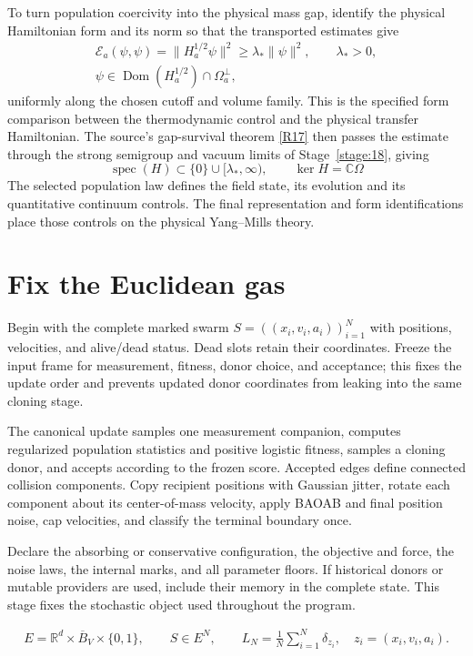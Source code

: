 \documentclass[11pt,a4paper]{article}
\newcommand{\Spec}{\operatorname{spec}}
\begin{document}
To turn population coercivity into the physical mass gap, identify the physical Hamiltonian form and its norm so that the transported estimates give
\begin{gather*}
\mathcal E_a(\psi,\psi)=\|H_a^{1/2}\psi\|^2
\ge\lambda_*\|\psi\|^2,
\qquad\lambda_*>0,\\
\psi\in\operatorname{Dom}(H_a^{1/2})\cap\Omega_a^\perp,
\end{gather*}
uniformly along the chosen cutoff and volume family. This is the specified form comparison between the thermodynamic control and the physical transfer Hamiltonian. The source's gap-survival theorem \hyperref[src:thm-mass-gap-rg-fixed-point]{[R17]} then passes the estimate through the strong semigroup and vacuum limits of Stage~\ref{stage:18}, giving
\[
\Spec(H)\subset\{0\}\cup[\lambda_*,\infty),
\qquad \ker H=\mathbb C\Omega
\]
The selected population law defines the field state, its evolution and its quantitative continuum controls. The final representation and form identifications place those controls on the physical Yang--Mills theory.


\section{Fix the Euclidean gas}
\label{stage:1}
Begin with the complete marked swarm \(S=((x_i,v_i,a_i))_{i=1}^N\) with positions, velocities, and alive/dead status. Dead slots retain their coordinates. Freeze the input frame for measurement, fitness, donor choice, and acceptance; this fixes the update order and prevents updated donor coordinates from leaking into the same cloning stage.

The canonical update samples one measurement companion, computes regularized population statistics and positive logistic fitness, samples a cloning donor, and accepts according to the frozen score. Accepted edges define connected collision components. Copy recipient positions with Gaussian jitter, rotate each component about its center-of-mass velocity, apply BAOAB and final position noise, cap velocities, and classify the terminal boundary once.

Declare the absorbing or conservative configuration, the objective and force, the noise laws, the internal marks, and all parameter floors. If historical donors or mutable providers are used, include their memory in the complete state. This stage fixes the stochastic object used throughout the program.


\begin{gather*}
E=\mathbb R^d\times\overline B_V\times\{0,1\},\qquad S\in E^N,\qquad L_N=\frac1N\sum_{i=1}^N\delta_{z_i},\quad z_i=(x_i,v_i,a_i).
\end{gather*}
\end{document}

